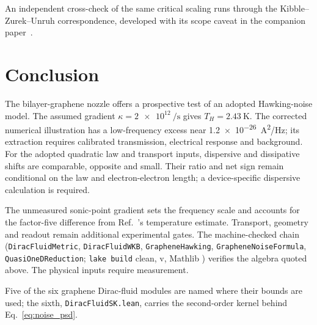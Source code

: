 \documentclass[aps,prl,twocolumn,superscriptaddress,nofootinbib]{revtex4-2}
\begin{document}
An independent cross-check of the same critical scaling runs through the
Kibble--Zurek--Unruh correspondence, developed with its scope caveat in the
companion paper~\cite{Roehm2026GrapheneDeep}.

\section{Conclusion}

The bilayer-graphene nozzle offers a prospective test of an adopted
Hawking-noise model. The assumed gradient
$\kappa=\SI{2e12}{\per\second}$ gives $T_H=\SI{2.43}{\kelvin}$.
The corrected numerical illustration has a low-frequency excess near
\SI{1.2e-26}{\ampere\squared/\hertz}; its extraction requires calibrated
transmission, electrical response and background. For the adopted
quadratic law and transport inputs, dispersive and dissipative shifts
are comparable, opposite and small. Their ratio and net sign remain
conditional on the law and electron-electron length; a device-specific
dispersive calculation is required.

The unmeasured sonic-point gradient sets the frequency scale and accounts
for the factor-five difference from Ref.~\cite{Geurs2025}'s temperature
estimate. Transport, geometry and readout remain additional experimental
gates. The machine-checked chain
(\texttt{DiracFluidMetric},
\texttt{DiracFluidWKB}, \texttt{GrapheneHawking}, \texttt{GrapheneNoiseFormula},
\texttt{QuasiOneDReduction}; \texttt{lake build} clean, v\leantoolchain,
Mathlib \texttt{\mathlibrev}) verifies the algebra quoted above.
The physical inputs require measurement.

\begin{acknowledgments}
Five of the six graphene Dirac-fluid modules are named where their bounds
are used; the sixth, \texttt{DiracFluidSK.lean}, carries the second-order
kernel behind Eq.~\eqref{eq:noise_psd}.
\end{acknowledgments}
\end{document}
